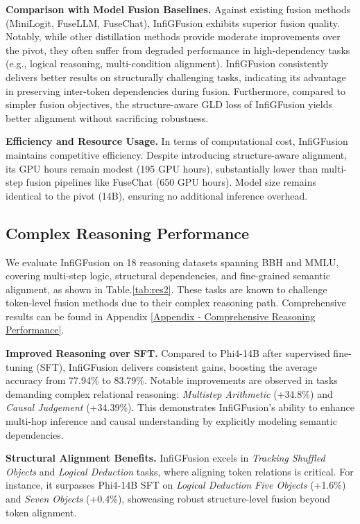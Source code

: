 \documentclass{article}
\begin{document}
\textbf{Comparison with Model Fusion Baselines.}
Against existing fusion methods (MiniLogit, FuseLLM, FuseChat), InfiGFusion exhibits superior fusion quality. Notably, while other distillation methods provide moderate improvements over the pivot, they often suffer from degraded performance in high-dependency tasks (e.g., logical reasoning, multi-condition alignment). InfiGFusion consistently delivers better results on structurally challenging tasks, indicating its advantage in preserving inter-token dependencies during fusion. Furthermore, compared to simpler fusion objectives, the structure-aware GLD loss of InfiGFusion yields better alignment without sacrificing robustness.

\textbf{Efficiency and Resource Usage.}
In terms of computational cost, InfiGFusion maintains competitive efficiency. Despite introducing structure-aware alignment, its GPU hours remain modest (195 GPU hours), substantially lower than multi-step fusion pipelines like FuseChat (650 GPU hours). Model size remains identical to the pivot (14B), ensuring no additional inference overhead.

\vspace{-3mm}


\subsection{Complex Reasoning Performance}

We evaluate InfiGFusion on 18 reasoning datasets spanning BBH and MMLU, covering multi-step logic, structural dependencies, and fine-grained semantic alignment, as shown in Table.\ref{tab:res2}. These tasks are known to challenge token-level fusion methods due to their complex reasoning path. Comprehensive results can be found in Appendix \ref{Appendix - Comprehensive Reasoning Performance}.

\textbf{Improved Reasoning over SFT.}
Compared to Phi4-14B after supervised fine-tuning (SFT), InfiGFusion delivers consistent gains, boosting the average accuracy from 77.94\% to 83.79\%. Notable improvements are observed in tasks demanding complex relational reasoning: \textit{Multistep Arithmetic} (+34.8\%) and \textit{Causal Judgement} (+34.39\%). This demonstrates InfiGFusion’s ability to enhance multi-hop inference and causal understanding by explicitly modeling semantic dependencies.

\textbf{Structural Alignment Benefits.}
InfiGFusion excels in \textit{Tracking Shuffled Objects} and \textit{Logical Deduction} tasks, where aligning token relations is critical. For instance, it surpasses Phi4-14B SFT on \textit{Logical Deduction Five Objects} (+1.6\%) and \textit{Seven Objects} (+0.4\%), showcasing robust structure-level fusion beyond token alignment.
\end{document}
